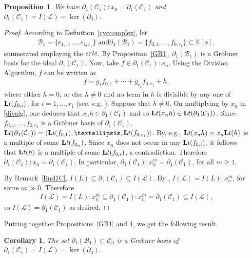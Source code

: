 \documentclass[10pt]{amsart}
\newcommand{\eg}{e.g.}
\newcommand{\mbk}{\mbox{$\mathbb{K}$}}
\newcommand{\lt}{\mbox{${\bf L}{\rm t}$}}
\newcommand{\mcb}{\mbox{$\mathcal{B}$}}
\newcommand{\mcc}{\mbox{$\mathcal{C}$}}
\newcommand{\mcl}{\mbox{$\mathcal{L}$}}
\newcommand{\dif}{\mbox{$\partial$}}
\newcommand{\srle}{\mbox{${\rm srle}$}}
\newtheorem{corollary}[cdrthm]{Corollary}
\newtheorem{proposition}[cdrthm]{Proposition}
\theoremstyle{definition}
\theoremstyle{remark}
\begin{document}
\begin{proposition}\label{colonideal}
We have $\dif_1(\mcc_1):x_n=\dif_1(\mcc_1)$ and
$\dif_1(\mcc_1)=I(\mcl)=\ker(\dif_0)$.
\end{proposition}
\begin{proof}
According to Definition~\ref{cyccomplex}, let 
\begin{eqnarray*}
\mcb_1=\{e_{1,1},\ldots ,e_{1,r_1}\}\mbox{ and
}\dif_1(\mcb_1)=\{f_{0,1},\ldots ,f_{0,r_1}\}\subset \mbk[x],
\end{eqnarray*}
enumerated employing the $\srle$.  By
Proposition~\ref{GB1}, $\dif_1(\mcb_1)$ is a Gr\"obner basis for the
ideal $\dif_1(\mcc_1)$. Now, take $f\in \dif_1(\mcc_1):x_n$. Using the
Division Algorithm, $f$ can be written as
\begin{eqnarray}\label{divalg}
f=g_1f_{0,1}+\cdots +g_{r_1}f_{0,r_1}+h, 
\end{eqnarray}
where either $h=0$, or else $h\neq 0$ and no term in $h$ is divisible
by any one of $\lt(f_{0,i})$, for $i=1,\ldots ,r_1$ (see, \eg
\cite[\S~2.3, Theorem~3]{clo}). Suppose that $h\neq 0$. On multiplying
by $x_n$ in \eqref{divalg}, one deduces that $x_nh\in \dif_1(\mcc_1)$
and so $\lt(x_nh)\in \lt(\dif_1(\mcc_1))$. Since $f_{0,1},\ldots
,f_{0,r_1}$ is a Gr\"obner basis of $\dif_1(\mcc_1)$,
$\lt(\dif_1(\mcc_1))=\langle \lt(f_{0,1}),\ldots
,\lt(f_{0,r_1})\rangle$. By, \eg \cite[\S~2.4, Lemma~2]{clo},
$\lt(x_nh)=x_n\lt(h)$ is a multiple of some $\lt(f_{0,_i})$.  Since
$x_n$ does not occur in any $\lt(f_{0,i})$, it follows that $\lt(h)$
is a multiple of some $\lt(f_{0,i})$, a contradiction. Therefore
$\dif_1(\mcc_1):x_n=\dif_1(\mcc_1)$. In particular,
$\dif_1(\mcc_1):x_n^{m}=\dif_1(\mcc_1)$, for all $m\geq 1$.

By Remark~\ref{Iind1C}, $I(L)\subseteq \dif_1(\mcc_1)\subseteq
I(\mcl)$.  By \cite[Proposition~5.7]{opv}, $I(\mcl)=I(L):x_n^m$, for
some $m\gg 0$. Therefore
\begin{eqnarray*}
I(\mcl)=I(L):x_n^m\subseteq
\dif_1(\mcc_1):x_n^m=\dif_1(\mcc_1)\subseteq I(\mcl),
\end{eqnarray*}
so $I(\mcl)=\dif_1(\mcc_1)$ as desired.
\end{proof}

Putting together Propositions~\ref{GB1} and \ref{colonideal}, we get
the following result.

\begin{corollary}\label{GBI(L)}
The set $\dif_1(\mcb_1)\subset\mcc_0$ is a Gr\"obner basis of
$\dif_1(\mcc_1)=I(\mcl)=\ker(\dif_0)$.
\end{corollary}
\end{document}
